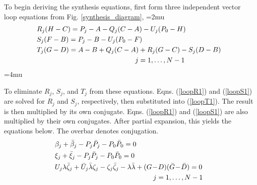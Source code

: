 \documentclass[journal]{IEEEtran}
\def\*#1{\bar{#1}} %
\begin{document}
To begin deriving the synthesis equations, first form three independent vector loop equations from Fig. \ref{synthesis_diagram},
\medmuskip=2mu
\begin{align}
&R_j(H-C) = P_j - A - Q_j(C-A) - U_j(P_0-H) \label{loopR1}\\
&S_j(F-B) = P_j - B - U_j(P_0-F) \label{loopS1}\\
&T_j(G-D) = A-B + Q_j(C-A) + R_j(G-C) - S_j(D-B) \label{loopT1}\\
&\hspace{50mm} j=1,\ldots,N-1 \nonumber
\end{align}
\medmuskip=4mu

To eliminate $R_j$, $S_j$, and $T_j$ from these equations.
Eqns. (\ref{loopR1}) and (\ref{loopS1}) are solved for $R_j$ and $S_j$, respectively, then substituted into (\ref{loopT1}).  The result is then multiplied by its own conjugate.  Eqns. (\ref{loopR1}) and (\ref{loopS1}) are also multiplied by their own conjugates.  After partial expansion, this yields the equations below.  The overbar denotes conjugation.
\begin{align}
&\beta_j + \*\beta_j - P_j\*P_j - P_0\*P_0 = 0 \label{loopbeta1}\\
&\xi_j + \*\xi_j - P_j\*P_j - P_0\*P_0 = 0 \label{loopxi1}\\
&U_j\lambda\*\zeta_j + \*U_j\*\lambda\zeta_j - \zeta_j\*\zeta_j - \lambda\*\lambda + (G\!-\!D)(\*G\!-\!\*D) = 0 \label{loopzeta1} \\
&\hspace{50mm} j=1,\ldots,N-1 \nonumber
\end{align}
\end{document}

